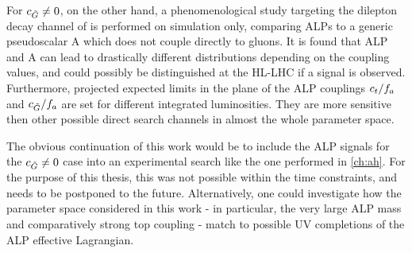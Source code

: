 For $c_{\tilde{G}} \neq 0$, on the other hand, a phenomenological study targeting the dilepton decay channel of \ttbar is performed on simulation only, comparing ALPs to a generic pseudoscalar A which does not couple directly to gluons. It is found that ALP and A can lead to drastically different \mtt distributions depending on the coupling values, and could possibly be distinguished at the HL-LHC if a signal is observed. Furthermore, projected expected limits in the plane of the ALP couplings $c_t/f_a$ and $c_{\tilde{G}}/f_a$ are set for different integrated luminosities. They are more sensitive then other possible direct search channels in almost the whole parameter space.

The obvious continuation of this work would be to include the ALP signals for the $c_{\tilde{G}} \neq 0$ case into an experimental search like the one performed in \cref{ch:ah}. For the purpose of this thesis, this was not possible within the time constraints, and needs to be postponed to the future. Alternatively, one could investigate how the parameter space considered in this work - in particular, the very large ALP mass and comparatively strong top coupling - match to possible UV completions of the ALP effective Lagrangian.%